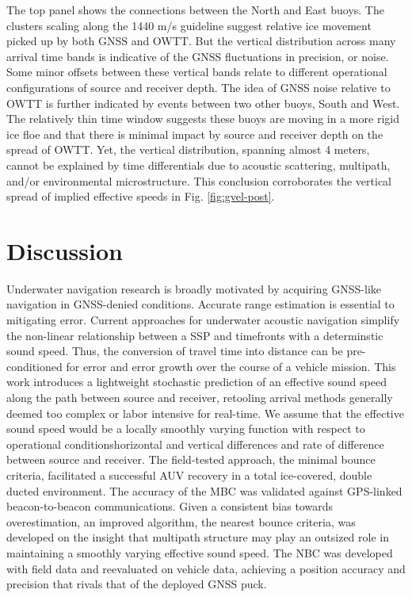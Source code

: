 The top panel shows the connections between the North and East buoys.
The clusters scaling along the 1440 m/s guideline suggest relative ice movement picked up by both GNSS and OWTT.
But the vertical distribution across many arrival time bands is indicative of the GNSS fluctuations in precision, or noise.
Some minor offsets between these vertical bands relate to different operational configurations of source and receiver depth.
The idea of GNSS noise relative to OWTT is further indicated by events between two other buoys, South and West.
The relatively thin time window suggests these buoys are moving in a more rigid ice floe and that there is minimal impact by source and receiver depth on the spread of OWTT.
Yet, the vertical distribution, spanning almost 4 meters, cannot be explained by time differentials due to acoustic scattering, multipath, and/or environmental microstructure.
This conclusion corroborates the vertical spread of implied effective speeds in Fig. \ref{fig:gvel-post}.

\clearpage
\section{Discussion}

Underwater navigation research is broadly motivated by acquiring GNSS-like navigation in GNSS-denied conditions.
Accurate range estimation is essential to mitigating error.
Current approaches for underwater acoustic navigation simplify the non-linear relationship between a SSP and timefronts with a determinstic sound speed.
Thus, the conversion of travel time into distance can be pre-conditioned for error and error growth over the course of a vehicle mission.
This work introduces a lightweight stochastic prediction of an effective sound speed along the path between source and receiver, retooling arrival methods generally deemed too complex or labor intensive for real-time.
We assume that the effective sound speed would be a locally smoothly varying function with respect to operational conditions\textemdash horizontal and vertical differences and rate of difference between source and receiver.
The field-tested approach, the minimal bounce criteria, facilitated a successful AUV recovery in a total ice-covered, double ducted environment.
The accuracy of the MBC was validated against GPS-linked beacon-to-beacon communications.
Given a consistent bias towards overestimation, an improved algorithm, the nearest bounce criteria, was developed on the insight that multipath structure may play an outsized role in maintaining a smoothly varying effective sound speed.
The NBC was developed with field data and reevaluated on vehicle data, achieving a position accuracy and precision that rivals that of the deployed GNSS puck.

